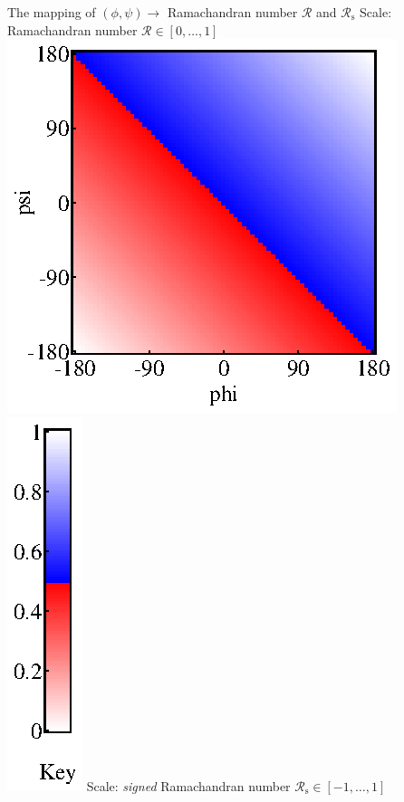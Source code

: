\documentclass[10pt]{article}         %
\date{\vspace{-5ex}}
\begin{document}
\newcommand{\w}{0.15}
\newcommand{\h}{0.6}
\newcommand{\hc}{0.6}
\newcommand{\centerit}[1]{\noindent\textcolor{white}{.}\hfil#1\hfil\newline}
{\Large The mapping of $(\phi,\psi) \to$ Ramachandran number ${\mathcal{R}}$ and ${\mathcal{R}_\textrm{s}}$}
\vfill
\Large Scale: Ramachandran number ${\mathcal{R}} \in [0,\ldots,1]$
\vfill
\noindent\includegraphics[height=\h\textwidth]{phi_psi_to_r.eps}
\includegraphics[height=\hc\textwidth]{phi_psi_to_r_colorbar.eps}
\vfill
\Large Scale: \textit{signed} Ramachandran number ${\mathcal{R}_\textrm{s}} \in [-1,\ldots,1]$
\end{document}
